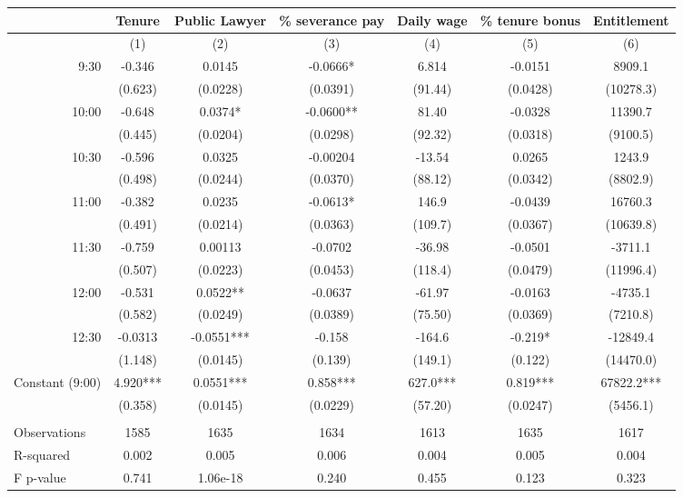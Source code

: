 \begin{tabular}{lcccccc}
\toprule
      & Tenure & Public Lawyer & \% severance pay & Daily wage & \% tenure bonus & Entitlement \\
\midrule
      & (1)   & (2)   & (3)   & (4)   & (5)   & (6) \\
\midrule
\midrule
\multicolumn{1}{r}{9:30} & -0.346 & 0.0145 & -0.0666* & 6.814 & -0.0151 & 8909.1 \\
      & (0.623) & (0.0228) & (0.0391) & (91.44) & (0.0428) & (10278.3) \\
\multicolumn{1}{r}{10:00} & -0.648 & 0.0374* & -0.0600** & 81.40 & -0.0328 & 11390.7 \\
      & (0.445) & (0.0204) & (0.0298) & (92.32) & (0.0318) & (9100.5) \\
\multicolumn{1}{r}{10:30} & -0.596 & 0.0325 & -0.00204 & -13.54 & 0.0265 & 1243.9 \\
      & (0.498) & (0.0244) & (0.0370) & (88.12) & (0.0342) & (8802.9) \\
\multicolumn{1}{r}{11:00} & -0.382 & 0.0235 & -0.0613* & 146.9 & -0.0439 & 16760.3 \\
      & (0.491) & (0.0214) & (0.0363) & (109.7) & (0.0367) & (10639.8) \\
\multicolumn{1}{r}{11:30} & -0.759 & 0.00113 & -0.0702 & -36.98 & -0.0501 & -3711.1 \\
      & (0.507) & (0.0223) & (0.0453) & (118.4) & (0.0479) & (11996.4) \\
\multicolumn{1}{r}{12:00} & -0.531 & 0.0522** & -0.0637 & -61.97 & -0.0163 & -4735.1 \\
      & (0.582) & (0.0249) & (0.0389) & (75.50) & (0.0369) & (7210.8) \\
\multicolumn{1}{r}{12:30} & -0.0313 & -0.0551*** & -0.158 & -164.6 & -0.219* & -12849.4 \\
      & (1.148) & (0.0145) & (0.139) & (149.1) & (0.122) & (14470.0) \\
Constant (9:00) & 4.920*** & 0.0551*** & 0.858*** & 627.0*** & 0.819*** & 67822.2*** \\
      & (0.358) & (0.0145) & (0.0229) & (57.20) & (0.0247) & (5456.1) \\
      &       &       &       &       &       &  \\
\midrule
Observations & 1585  & 1635  & 1634  & 1613  & 1635  & 1617 \\
R-squared & 0.002 & 0.005 & 0.006 & 0.004 & 0.005 & 0.004 \\
F p-value & 0.741 & 1.06e-18 & 0.240 & 0.455 & 0.123 & 0.323 \\
\bottomrule
\bottomrule
\end{tabular}%
